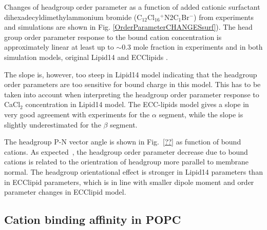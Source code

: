 \documentclass[aip,jcp,twocolumn]{revtex4}
\begin{document}
Changes of headgroup order parameter as a function of added cationic surfactant
dihexadecyldimethylammonium bromide (C$_{12}$Cl$_{16}$$^+$N2C$_1$Br$^-$) from
experiments~\cite{scherer89} and simulations are shown in
Fig. \ref{OrderParameterCHANGESsurf}).
The head group order parameter response to the bound cation concentration
is approximately linear at least up to $\sim$0.3 mole fraction in experiments and
in both simulation models, original Lipid14 and ECClipids . 

The slope is, however, too steep in Lipid14 model indicating that the
headgroup order parameters are too sensitive for bound charge in this model.
This has to be taken into account when interpreting the
headgroup order parameter response to CaCl$_2$ concentration in Lipid14 model.
The ECC-lipids model gives a slope in very good agreement with experiments
for the $\alpha$ segment, while the slope is slightly
underestimated for the $\beta$ segment.

The headgroup P-N vector angle is shown in Fig.~\ref{??} as
function of bound cations.
As expected~\cite{seelig87}, the headgroup order parameter decrease due 
to bound cations is related to the orientration of headgroup more parallel
to membrane normal. The headgroup orientational effect is stronger
in Lipid14 parameters than in ECClipid parameters, which is in line
with smaller dipole moment and order parameter changes in ECClipid model.




\subsection{Cation binding affinity in POPC}
\end{document}

